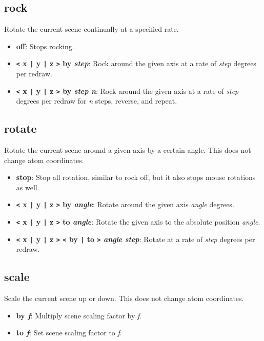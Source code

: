   \subsection{rock}
Rotate the current scene continually at a specified rate.

  \begin{itemize}
    \item {\bf  off}: Stops rocking.
    \item {\bf  {\tt <}  x {\tt |} y {\tt |} z {\tt >}  by {\it step}}: Rock around 
the given axis at a rate of {\it step} degrees per redraw.
    \item {\bf  {\tt <}  x {\tt |} y {\tt |} z {\tt >}  by {\it step} {\it n}}: 
Rock around the given axis at a rate of {\it step} degrees per redraw for 
{\it n} steps, reverse, and repeat.
  \end{itemize}


  \subsection{rotate}
Rotate the current scene around a given axis by a certain angle.
This does not change atom coordinates.

  \begin{itemize}
    \item {\bf  stop}: Stop all rotation, similar to rock off, but it also stops mouse rotations as well.
    \item {\bf  {\tt <}  x {\tt |} y {\tt |} z {\tt >}  by {\it angle}}: Rotate 
around the given axis {\it angle} degrees.
    \item {\bf  {\tt <}  x {\tt |} y {\tt |} z {\tt >}  to {\it angle}}: Rotate the 
given axis to the absolute position {\it angle}.
    \item {\bf  {\tt <}  x {\tt |} y {\tt |} z {\tt >}  {\tt <}  by {\tt |} to 
{\tt >}  {\it angle} {\it step}}: Rotate at a rate of {\it step} degrees per 
redraw.
  \end{itemize}



  \subsection{scale}
Scale the current scene up or down.
This does not change atom coordinates.

  \begin{itemize}
    \item {\bf  by {\it f}}: Multiply scene scaling factor by {\it f}.
    \item {\bf  to {\it f}}: Set scene scaling factor to {\it f}.
  \end{itemize}

